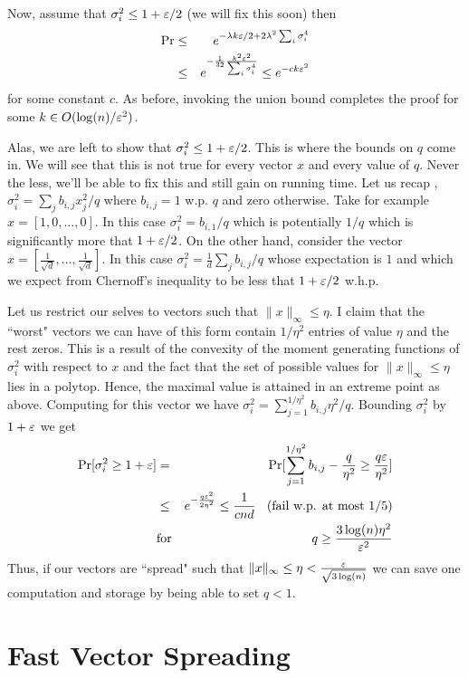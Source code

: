 \documentclass{article}
\begin{document}
Now, assume that $\sigma^2_i \le 1+\varepsilon/2$ (we will fix this soon) then
\begin{eqnarray}
\Pr &\le& e^{ - \lambda k \varepsilon/2  + 2\lambda^2 \sum_{i}\sigma^{4}_{i}}\\
&\le&e^{ - \frac{1}{32} \frac{k^2\varepsilon^2}{\sum_{i}\sigma_i^4}} \le e^{-ck\varepsilon^2}
\end{eqnarray}
for some constant $c$. As before, invoking the union bound completes the proof for some $k \in O(\log(n)/\varepsilon^2)$.


Alas, we are left to show that $\sigma^2_i \le 1+\varepsilon/2$. This is where the bounds on $q$ come in.
We will see that this is not true for every vector $x$ and every value of $q$.
Never the less, we'll be able to fix this and still gain on running time.
Let us recap , $\sigma^2_i = \sum_{j} b_{i,j} x_j^2/q$ where $b_{i,j} = 1$ w.p. $q$ and zero otherwise. 
Take for example $x = [1,0,\ldots,0]$. In this case $\sigma^2_i = b_{i,1}/q$ which is potentially $1/q$
which is significantly more that $1+\varepsilon/2$. On the other hand, consider the vector $x = [\frac{1}{\sqrt{d}},\dots,\frac{1}{\sqrt{d}}]$.
In this case $\sigma^2_i =\frac{1}{d} \sum_{j} b_{i,j}/q$ whose expectation is $1$ 
and which we expect from Chernoff's inequality to be less that $1+\varepsilon/2$ w.h.p.

Let us restrict our selves to vectors such that $\|x\|_\infty \le \eta$. I claim that the ``worst" vectors we can 
have of this form contain $1/\eta^2$ entries of value $\eta$ and the rest zeros. This is a result 
of the convexity of the moment generating functions of $\sigma^2_i$ with respect to $x$ and the fact
that the set of possible values for $\|x\|_\infty \le \eta$ lies in a polytop. 
Hence, the maximal value is attained in an extreme point as above.
Computing for this vector we have $\sigma^2_i = \sum_{j=1}^{1/\eta^2} b_{i,j}\eta^2/q$.
Bounding $\sigma^2_i$ by $1+\varepsilon$ we get
\begin{eqnarray}
\Pr[\sigma^2_i \ge 1+\varepsilon] &=& \Pr[\sum_{j=1}^{1/\eta^2} b_{i,j} - \frac{q}{\eta^2} \ge \frac{q\varepsilon}{\eta^2}]\\
&\le& e^{-\frac{q\varepsilon^2}{2\eta^2}} \le \frac{1}{cnd} \mbox{ \;\;(fail w.p. at most $1/5$)}\\
&\mbox{for}& q \ge \frac{3\log(n)\eta^2}{\varepsilon^2}
\end{eqnarray}
Thus, if our vectors are ``spread" such that $\|x\|_\infty \le \eta < \frac{\varepsilon}{\sqrt{3\log(n)}}$ we can save one computation and storage
by being able to set $q < 1$. 


\section{Fast Vector Spreading}
\end{document}
